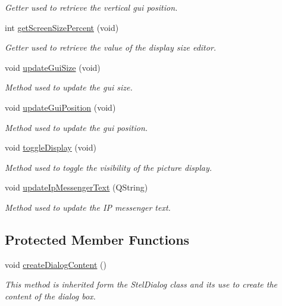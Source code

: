 \begin{DoxyCompactItemize}
\begin{DoxyCompactList}\small\item\em Getter used to retrieve the vertical gui position. \end{DoxyCompactList}\item 
int \mbox{\hyperlink{class_autoscope_window_form_a51b6c47d99b53207d9e65157f01270ff}{get\+Screen\+Size\+Percent}} (void)
\begin{DoxyCompactList}\small\item\em Getter used to retrieve the value of the display size editor. \end{DoxyCompactList}\item 
void \mbox{\hyperlink{class_autoscope_window_form_af62e38bc2170d8504f63f07e5d0b4943}{update\+Gui\+Size}} (void)
\begin{DoxyCompactList}\small\item\em Method used to update the gui size. \end{DoxyCompactList}\item 
void \mbox{\hyperlink{class_autoscope_window_form_aada2c3ef979ce1718bb981490f6c7495}{update\+Gui\+Position}} (void)
\begin{DoxyCompactList}\small\item\em Method used to update the gui position. \end{DoxyCompactList}\item 
void \mbox{\hyperlink{class_autoscope_window_form_adfa249163e1c2a72485c24a575a67efb}{toggle\+Display}} (void)
\begin{DoxyCompactList}\small\item\em Method used to toggle the visibility of the picture display. \end{DoxyCompactList}\item 
void \mbox{\hyperlink{class_autoscope_window_form_a38a4a73945cffab764db46b8deec800a}{update\+Ip\+Messenger\+Text}} (Q\+String)
\begin{DoxyCompactList}\small\item\em Method used to update the IP messenger text. \end{DoxyCompactList}\end{DoxyCompactItemize}
\subsection*{Protected Member Functions}
\begin{DoxyCompactItemize}
\item 
void \mbox{\hyperlink{class_autoscope_window_form_ab48246f0892a43963b7d209dc3bf4b4f}{create\+Dialog\+Content}} ()
\begin{DoxyCompactList}\small\item\em This method is inherited form the Stel\+Dialog class and it\textquotesingle{}s use to create the content of the dialog box. \end{DoxyCompactList}\end{DoxyCompactItemize}
